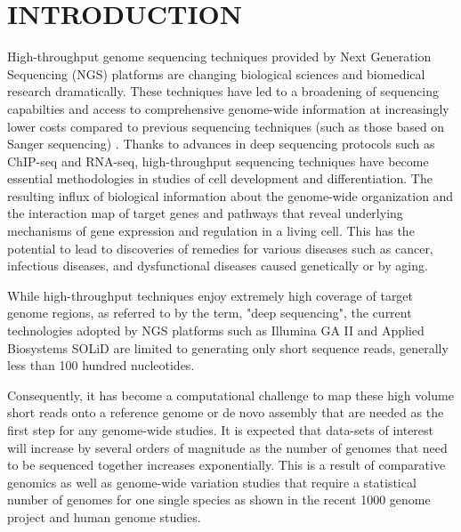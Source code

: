 \documentclass{acm_proc_article-sp}
\begin{document}
 


\section{INTRODUCTION} 

High-throughput genome sequencing techniques provided by Next
Generation Sequencing (NGS) platforms are changing biological sciences
and biomedical research dramatically.  These techniques have led to a
broadening of sequencing capabilties and access to comprehensive
genome-wide information at increasingly lower costs compared to
previous sequencing techniques (such as those based on Sanger
sequencing)
\cite{metzker2010,mardis2008-tig,mardis2008-arghg,gilad2009,mortazavi2008,sorek2010}.
Thanks to advances in deep sequencing protocols such as ChIP-seq and
RNA-seq, high-throughput sequencing techniques have become essential
methodologies in studies of cell development and
differentiation\cite{wang2009-natrevgen,pepke2009,gilad2009,mortazavi2008,sorek2010}.
The resulting influx of biological information about the genome-wide
organization and the interaction map of target genes and pathways that
reveal underlying mechanisms of gene expression and regulation in a
living cell. This has the potential to lead to discoveries of remedies
for various diseases such as cancer, infectious diseases, and
dysfunctional diseases caused genetically or by
aging\cite{amaral2008,encode2007,baek2008,costa2009}.


While high-throughput techniques enjoy extremely high coverage of
target genome regions, as referred to by the term, "deep sequencing",
the current technologies adopted by NGS platforms such as Illumina GA
II and Applied Biosystems SOLiD are limited to generating only short
sequence reads, generally less than 100 hundred
nucleotides\cite{metzker2010}.  

Consequently, it has become a computational challenge to map these
high volume short reads onto a reference genome or de novo assembly
that are needed as the first step for any genome-wide
studies\cite{alex2009,trapnell2009,scheibye-alsing2009,pop2002,hernandez2008,farrer2008}.
It is expected that data-sets of interest will increase by several
orders of magnitude as the number of genomes that need to be sequenced
together increases exponentially.  This is a result of comparative
genomics as well as genome-wide variation studies that require a
statistical number of genomes for one single species as shown in the
recent 1000 genome project and human genome
studies\cite{1000genome,mardis2008-tig,gilad2009,alex2009,kim2011}.
\end{document}
